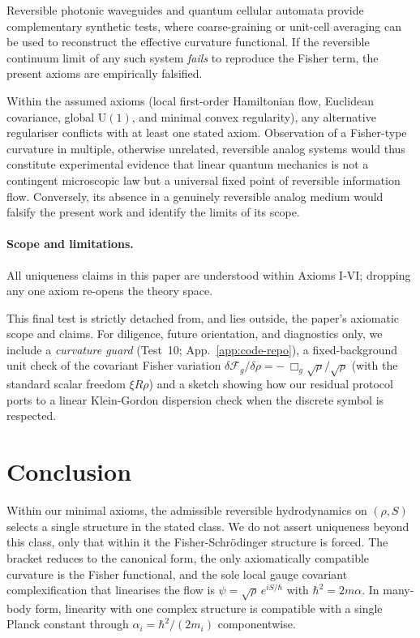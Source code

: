\documentclass[11pt,a4paper]{article}
\numberwithin{equation}{section}
\theoremstyle{thmcompact}
\theoremstyle{remark}
\begin{document}
	Reversible photonic waveguides and quantum cellular automata provide complementary synthetic tests,
	where coarse-graining or unit-cell averaging can be used to reconstruct the effective curvature functional.
	If the reversible continuum limit of any such system \emph{fails} to reproduce the Fisher term,
	the present axioms are empirically falsified.
	
	Within the assumed axioms (local first-order Hamiltonian flow, Euclidean covariance, global $\mathrm{U}(1)
$, and minimal convex regularity), any alternative regulariser conflicts with at least one stated axiom.
	Observation of a Fisher-type curvature in multiple, otherwise unrelated,
	reversible analog systems would thus constitute experimental evidence
	that linear quantum mechanics is not a contingent microscopic law
	but a universal fixed point of reversible information flow.
	Conversely, its absence in a genuinely reversible analog medium
	would falsify the present work and identify the limits of its scope.

\paragraph{Scope and limitations.}
All uniqueness claims in this paper are understood within Axioms I-VI; dropping any one axiom re-opens the theory space.

This final test is strictly detached from, and lies outside, the paper's axiomatic scope and claims. For diligence, future orientation, and diagnostics only, we include a \emph{curvature guard} (Test~10; App.~\ref{app:code-repo}), a fixed-background unit check of the covariant Fisher variation $\delta\mathcal F_g/\delta\rho=-\,\Box_g\sqrt{\rho}/\sqrt{\rho}$ (with the standard scalar freedom $\xi R\rho$) and a sketch showing how our residual protocol ports to a linear Klein-Gordon dispersion check when the discrete symbol is respected.
	
\section*{Conclusion}

Within our minimal axioms, the admissible reversible hydrodynamics on $(\rho,S)$ selects a single structure in the stated class. We do not assert uniqueness beyond this class, only that within it the Fisher-Schrödinger structure is forced.
The bracket reduces to the canonical form, the only axiomatically compatible curvature is the Fisher functional, and the sole local gauge covariant complexification that linearises the flow is $\psi=\sqrt{\rho}\,e^{iS/\hbar}$ with $\hbar^2=2m\alpha$. In many-body form, linearity with one complex structure is compatible with a single Planck constant through $\alpha_i=\hbar^2/(2m_i)$ componentwise.
\end{document}
